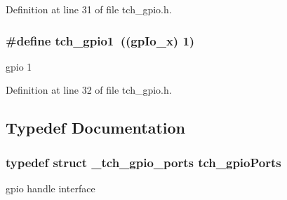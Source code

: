 Definition at line 31 of file tch\+\_\+gpio.\+h.

\hypertarget{group___h_a_l_gaec7a9f2671c2310088b6b3be57837938}{
\subsubsection[{tch\+\_\+gpio1}]{\setlength{\rightskip}{0pt plus 5cm}\#define tch\+\_\+gpio1~((gp\+Io\+\_\+x) 1)}}\label{group___h_a_l_gaec7a9f2671c2310088b6b3be57837938}
gpio 1 

Definition at line 32 of file tch\+\_\+gpio.\+h.



\subsection{Typedef Documentation}
\hypertarget{group___h_a_l_gad6418022c4ec33bbb97825b9136d3e03}{
\subsubsection[{tch\+\_\+gpio\+Ports}]{\setlength{\rightskip}{0pt plus 5cm}typedef struct {\bf \+\_\+tch\+\_\+gpio\+\_\+ports} {\bf tch\+\_\+gpio\+Ports}}}\label{group___h_a_l_gad6418022c4ec33bbb97825b9136d3e03}
gpio handle interface 